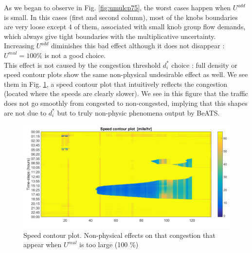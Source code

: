 As we began to observe in Fig. \ref{fig:umulcp75}, the worst cases happen when $U^{add}$ is small. In this cases (first and second column), most of the knobs boundaries are very loose except 4 of them, associated with small knob group flow demands, which always give tight boundaries with the multiplicative uncertainty.\\
Increasing $U^{add}$ diminishes this bad effect although it does not disappear : $U^{mul}=100\% $ is not a good choice.\\
This effect is not caused by the congestion threshold $d_{i}^{*}$ choice : full density or speed contour plots show the same non-physical undesirable effect as well. We see them in Fig. \ref{fig:badcontourplot}, a speed contour plot that intuitively reflects the congestion (located where the speeds are clearly slower).
We see in this figure that the traffic does not go smoothly from congested to non-congested, implying that this shapes are not due to $d_{i}^{*}$ but to truly non-physic phenomena output by BeATS.
\begin{figure}
	\label{fig:badcontourplot}
	\caption{Speed contour plot. Non-physical effects on that congestion that appear when $U^{mul}$ is too large (100 \%)}
	\includegraphics[width=7in]{figures/results_figures/Umul/badcontourplot.png}
\end{figure}